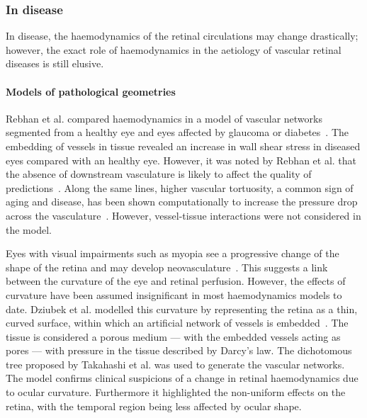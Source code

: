 \documentclass{article}
\begin{document}
\subsubsection{In disease} \label{sec:InDisease}

In disease, the haemodynamics of the retinal circulations may change drastically; however, the exact role of haemodynamics in the aetiology of vascular retinal diseases is still elusive.

\paragraph*{Models of pathological geometries} 

Rebhan et al. compared haemodynamics in a model of vascular networks segmented from a healthy eye and eyes affected by glaucoma or diabetes~\cite{Rebhan_2019}.
The embedding of vessels in tissue revealed an increase in wall shear stress in diseased eyes compared with an healthy eye.
However, it was noted by Rebhan et al. that the absence of downstream vasculature is likely to affect the quality of predictions~\cite{Rebhan_2019}.
Along the same lines, higher vascular tortuosity, a common sign of aging and disease, has been shown computationally to increase the pressure drop across the vasculature~\cite{Malek_2014}.
However, vessel-tissue interactions were not considered in the model.

Eyes with visual impairments such as myopia see a progressive change of the shape of the retina and may develop neovasculature~\cite{Medina_2016}.
This suggests a link between the curvature of the eye and retinal perfusion.
However, the effects of curvature have been assumed insignificant in most haemodynamics models to date.
Dziubek et al. modelled this curvature by representing the retina as a thin, curved surface, within which an artificial network of vessels is embedded~\cite{Dziubek_2015}.
The tissue is considered a porous medium --- with the embedded vessels acting as pores --- with pressure in the tissue described by Darcy's law.
The dichotomous tree proposed by Takahashi et al. was used to generate the vascular networks.
The model confirms clinical suspicions of a change in retinal haemodynamics due to ocular curvature.
Furthermore it highlighted the non-uniform effects on the retina, with the temporal region being less affected by ocular shape\cite{Dziubek_2015}.
\end{document}
